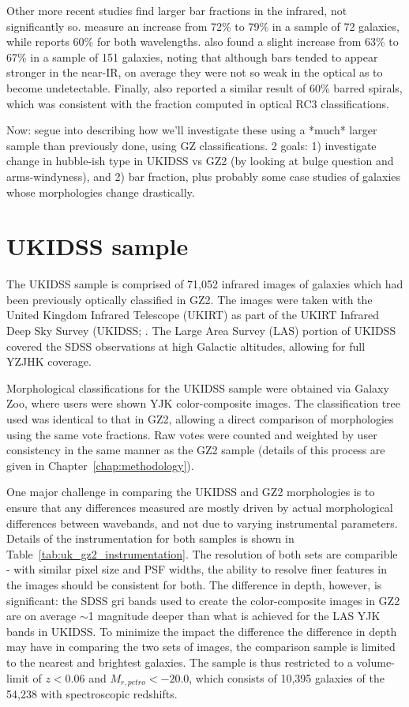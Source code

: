 Other more recent studies find larger bar fractions in the infrared, not significantly so. \citet{Whyte2002} measure an increase from 72\% to 79\% in a sample of 72 galaxies, while \citet{Sheth2008} reports 60\% for both wavelengths. \citet{MenendezDelmestre2007} also found a slight increase from 63\% to 67\% in a sample of 151 galaxies, noting that although bars tended to appear stronger in the near-IR, on average they were not so weak in the optical as to become undetectable. Finally, \citet{Buta2010} also reported a similar result of 60\% barred spirals, which was consistent with the fraction computed in optical RC3 classifications.

Now: segue into describing how we'll investigate these using a *much* larger sample than previously done, using GZ classifications. 2 goals: 1) investigate change in hubble-ish type in UKIDSS vs GZ2 (by looking at bulge question and arms-windyness), and 2) bar fraction, plus probably some case studies of galaxies whose morphologies change drastically.   

\section{UKIDSS sample}

The UKIDSS sample is comprised of 71,052 infrared images of galaxies which had been previously optically classified in GZ2. The images were taken with the United Kingdom Infrared Telescope (UKIRT) as part of the UKIRT Infrared Deep Sky Survey (UKIDSS; \citet{Lawrence2007,Warren2007}. The Large Area Survey (LAS) portion of UKIDSS covered the SDSS observations at high Galactic altitudes, allowing for full YZJHK coverage.  

Morphological classifications for the UKIDSS sample were obtained via Galaxy Zoo, where users were shown YJK color-composite images. The classification tree used was identical to that in GZ2, allowing a direct comparison of morphologies using the same vote fractions. Raw votes were counted and weighted by user consistency in the same manner as the GZ2 sample (details of this process are given in Chapter~\ref{chap:methodology}).

One major challenge in comparing the UKIDSS and GZ2 morphologies is to ensure that any differences measured are mostly driven by actual morphological differences between wavebands, and not due to varying instrumental parameters. Details of the instrumentation for both samples is shown in Table~\ref{tab:uk_gz2_instrumentation}. The resolution of both sets are comparible - with similar pixel size and PSF widths, the ability to resolve finer features in the images should be consistent for both. The difference in depth, however, is significant: the SDSS gri bands used to create the color-composite images in GZ2 are on average $\sim$1 magnitude deeper than what is achieved for the LAS YJK bands in UKIDSS. To minimize the impact the difference the difference in depth may have in comparing the two sets of images, the comparison sample is limited to the nearest and brightest galaxies. 
The sample is thus restricted to a volume-limit of $z<0.06$ and $M_{r,petro}<-20.0$, which consists of 10,395 galaxies of the 54,238 with spectroscopic redshifts. 


